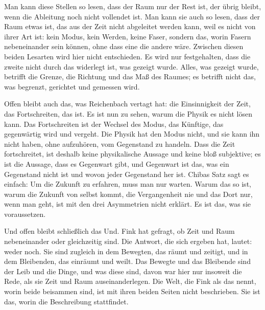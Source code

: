 Man kann diese Stellen so lesen, dass der Raum nur der Rest ist, der übrig bleibt, wenn die Ableitung noch nicht vollendet ist. Man kann sie auch so lesen, dass der Raum etwas ist, das aus der Zeit nicht abgeleitet werden kann, weil es nicht von ihrer Art ist: kein Modus, kein Werden, keine Faser, sondern das, worin Fasern nebeneinander sein können, ohne dass eine die andere wäre. Zwischen diesen beiden Lesarten wird hier nicht entschieden. Es wird nur festgehalten, dass die zweite nicht durch das widerlegt ist, was gezeigt wurde. Alles, was gezeigt wurde, betrifft die Grenze, die Richtung und das Maß des Raumes; es betrifft nicht das, was begrenzt, gerichtet und gemessen wird.

Offen bleibt auch das, was Reichenbach vertagt hat: die Einsinnigkeit der Zeit, das Fortschreiten, das  ist. Es ist nun zu sehen, warum die Physik es nicht lösen kann. Das Fortschreiten ist der Wechsel des Modus, das Künftige, das gegenwärtig wird und vergeht. Die Physik hat den Modus nicht, und sie kann ihn nicht haben, ohne aufzuhören, vom Gegenstand zu handeln. Dass die Zeit fortschreitet, ist deshalb keine physikalische Aussage und keine bloß subjektive; es ist die Aussage, dass es Gegenwart gibt, und Gegenwart ist das, was ein Gegenstand nicht ist und wovon jeder Gegenstand her ist. Chibas Satz sagt es einfach: Um die Zukunft zu erfahren, muss man nur warten. Warum das so ist, warum die Zukunft von selbst kommt, die Vergangenheit nie und das Dort nur, wenn man geht, ist mit den drei Asymmetrien nicht erklärt. Es ist das, was sie voraussetzen.

Und offen bleibt schließlich das Und. Fink hat gefragt, ob Zeit und Raum nebeneinander oder gleichzeitig sind. Die Antwort, die sich ergeben hat, lautet: weder noch. Sie sind zugleich in dem Bewegten, das räumt und zeitigt, und in dem Bleibenden, das einräumt und weilt. Das Bewegte und das Bleibende sind der Leib und die Dinge, und was diese sind, davon war hier nur insoweit die Rede, als sie Zeit und Raum auseinanderlegen. Die Welt, die Fink als das nennt, worin beide beisammen sind, ist mit ihren beiden Seiten nicht beschrieben. Sie ist das, worin die Beschreibung stattfindet.
